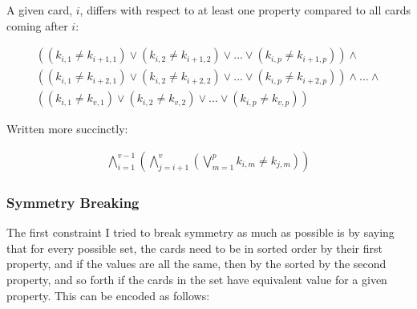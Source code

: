 \documentclass[pageno]{jpaper}
\begin{document}

A given card, $i$, differs with respect to at least one property compared to all cards coming after $i:$

\begin{multline}
	((k_{i,1} \neq k_{i+1,1}) \vee (k_{i,2} \neq k_{i+1,2}) \vee ... \vee (k_{i,p} \neq k_{i+1,p}))  \wedge \\
	((k_{i,1} \neq k_{i+2,1}) \vee (k_{i,2} \neq k_{i+2,2}) \vee ... \vee (k_{i,p} \neq k_{i+2,p}))  \wedge ... \wedge \\ 
	((k_{i,1} \neq k_{v,1}) \vee (k_{i,2} \neq k_{v,2}) \vee ... \vee (k_{i,p} \neq k_{v,p})) 
\end{multline}

Written more succinctly:





\begin{align}
	\bigwedge \limits_{i=1}^{v-1}   \left( \bigwedge \limits_{j=i+1}^{v}   \left( \bigvee \limits_{m = 1}^{p} k_{i,m} \neq k_{j,m} \right)  \right)
\end{align}

\subsubsection {Symmetry Breaking}

The first constraint I tried to break symmetry as much as possible is by saying that for every possible set, the cards need to be in sorted order by their first property, and if the values are all the same, then by the sorted by the second property, and so forth if the cards in the set have equivalent value for a given property. This can be encoded as follows: 
\end{document}
